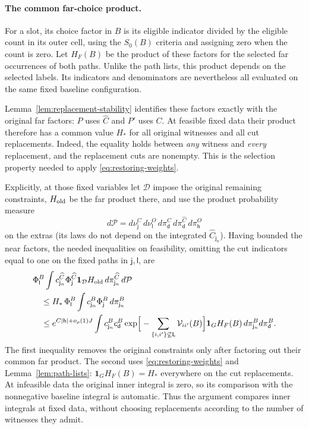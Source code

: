 \paragraph{The common far-choice product.}
For a slot, its choice factor in $B$ is its eligible indicator divided
by the eligible count in its outer cell, using the $S_0(B)$ criteria
and assigning zero when the count is zero. Let $H_F(B)$ be the product
of these factors for the selected far occurrences of both paths.
Unlike the path lists, this product depends on the selected labels.
Its indicators and denominators are nevertheless all evaluated on the
same fixed baseline configuration.

Lemma~\ref{lem:replacement-stability} identifies these factors exactly
with the original far factors: $P$ uses $\widehat C$ and $P'$ uses $C$.
At feasible fixed data their product therefore has a common value
$H_*$ for all original witnesses and all cut replacements. Indeed,
the equality holds between \emph{any} witness and \emph{every}
replacement, and the replacement cuts are nonempty. This is the
selection property needed to apply \eqref{eq:restoring-weights}.



Explicitly, at those fixed variables let \(\mathcal D\) impose the original remaining constraints, \(H_{\rm old}\) be the far product there, and use the product probability measure
\[
d\mathcal P=d\nu_{\mathsf j}^C\, d\nu_{\mathsf l}^O\,
 d\pi_{\mathsf d}^C\,d\pi_{\mathsf d}^{\widehat C}\,d\pi_{\mathsf h}^O
\]
on the extras (its laws do not depend on the integrated \(\widehat C_{\mathsf j_n}\)). Having bounded the near factors, the needed inequalities on feasibility, omitting the cut indicators equal to one on the fixed paths in \(\mathsf j,\mathsf l\), are
\[
\begin{split}
 &\Phi_{\mathsf l}^B
 \int c_{\mathsf j_n}^{\widehat C}\Phi_{\mathsf j}^{\widehat C}
       \mathbf 1_{\mathcal D} H_{\rm old}\,d\pi_{\mathsf j_n}^{\widehat C}\,d\mathcal P\\
 &\quad\le H_*\,\Phi_{\mathsf l}^B
      \int c_{\mathsf j_n}^B\Phi_{\mathsf j}^B\,d\pi_{\mathsf j_n}^B\\
 &\quad\le e^{C|\mathsf h|+o_\rho(1)J}
      \int c_{\mathsf j_n}^B c_{\mathsf d}^B
       \exp\!\Big[-\sum_{\{i,i'\}\not\subseteq\mathsf L}
                          \mathcal V_{ii'}(B)\Big]\mathbf 1_G H_F(B)\,
                       d\pi_{\mathsf j_n}^B d\pi_{\mathsf d}^B .
\end{split}
\]
The first inequality removes the original constraints only after
factoring out their common far product. The second uses
\eqref{eq:restoring-weights} and Lemma~\ref{lem:path-lists}:
$\mathbf1_GH_F(B)=H_*$ everywhere on the cut replacements. At
infeasible data the original inner integral is zero, so its comparison
with the nonnegative baseline integral is automatic. Thus the argument
compares inner integrals at fixed data, without choosing replacements
according to the number of witnesses they admit.

